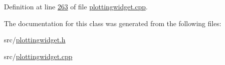 Definition at line \hyperlink{plottingwidget_8cpp_source_l00263}{263} of file \hyperlink{plottingwidget_8cpp_source}{plottingwidget.\+cpp}.



The documentation for this class was generated from the following files\+:\begin{DoxyCompactItemize}
\item 
src/\hyperlink{plottingwidget_8h}{plottingwidget.\+h}\item 
src/\hyperlink{plottingwidget_8cpp}{plottingwidget.\+cpp}\end{DoxyCompactItemize}
